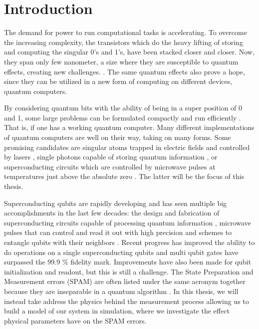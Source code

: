 \chapter{Introduction}\label{chap:Introduction}
The demand for power to run computational tasks is accelerating. To overcome the increasing complexity, the transistors which do the heavy lifting of storing and computing the singular 0's and 1's, have been stacked closer and closer. Now, they span only few nanometer, a size where they are susceptible to quantum effects, creating new challenges. \cite{morton_embracing_2011}. The same quantum effects also prove a hope, since they can be utilized in a new form of computing on different devices, quantum computers. 

By considering quantum bits with the ability of being in a super position of 0 and 1, some large problems can be formulated compactly and run efficiently \cite{preskill_quantum_2018}. That is, if one has a working quantum computer. Many different implementations of quantum computers are well on their way, taking on many forms. Some promising candidates are  singular atoms trapped in electric fields and controlled by lasers \cite{brown_co-designing_2016}, single photons capable of storing quantum information \cite{obrien_optical_2007}, or superconducting circuits which are controlled by microwave pulses at temperatures just above the absolute zero \cite{krantz_quantum_2019}. The latter will be the focus of this thesis. 

Superconducting qubits are rapidly developing and has seen multiple big accomplishments in the last few decades: the design and fabrication of superconducting circuits capable of processing quantum information \cite{koch_charge_2007, manucharyan_fluxonium_2009}, microwave pulses that can control and read it out with high precision \cite{motzoi_simple_2009, READOUT} and schemes to entangle qubits with their neighbors \cite{yan_tunable_2018}. Recent progress has improved the ability to do operations on a single superconducting qubits \cite{barends_superconducting_2014} and multi qubit gates have surpassed the 99.9 \% fidelity mark\cite{ding_high-fidelity_2023}. Improvements have also been made for qubit initialization and readout\cite{walter_rapid_2017, swiadek_enhancing_2023}, but this is still a challenge. The State Preparation and Measurement errors (SPAM) are often listed under the same acronym together because they are inseparable in a quantum algorithm \cite{SPAM}. In this thesis, we will instead take address the physics behind the measurement process allowing us to build a model of our system in simulation, where we investigate the effect physical parameters have on the SPAM errors. 


